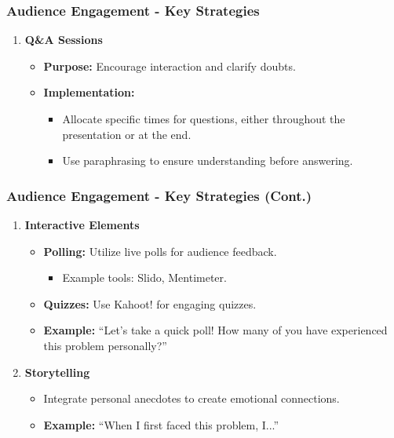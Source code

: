 \documentclass{beamer}
\begin{document}
\begin{frame}[fragile]
    \frametitle{Audience Engagement - Key Strategies}
    \begin{enumerate}
        \item \textbf{Q\&A Sessions}
        \begin{itemize}
            \item \textbf{Purpose:} Encourage interaction and clarify doubts.
            \item \textbf{Implementation:}
            \begin{itemize}
                \item Allocate specific times for questions, either throughout the presentation or at the end.
                \item Use paraphrasing to ensure understanding before answering.
            \end{itemize}
        \end{itemize}
    \end{enumerate}
\end{frame}

\begin{frame}[fragile]
    \frametitle{Audience Engagement - Key Strategies (Cont.)}
    \begin{enumerate}[resume]
        \item \textbf{Interactive Elements}
        \begin{itemize}
            \item \textbf{Polling:} Utilize live polls for audience feedback.
                \begin{itemize}
                    \item Example tools: Slido, Mentimeter.
                \end{itemize}
            \item \textbf{Quizzes:} Use Kahoot! for engaging quizzes.
            \item \textbf{Example:} “Let’s take a quick poll! How many of you have experienced this problem personally?”
        \end{itemize}
        \item \textbf{Storytelling}
        \begin{itemize}
            \item Integrate personal anecdotes to create emotional connections.
            \item \textbf{Example:} “When I first faced this problem, I...”
        \end{itemize}
    \end{enumerate}
\end{frame}
\end{document}
